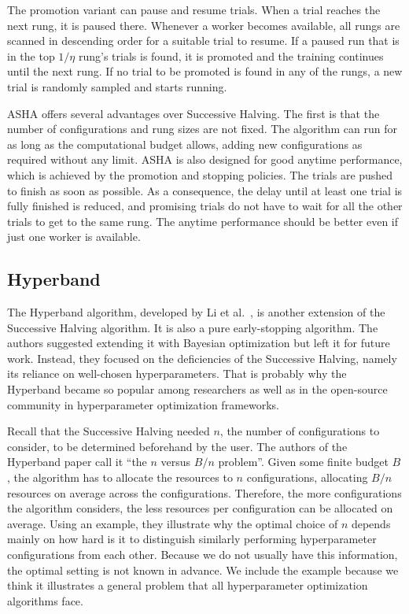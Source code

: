  The promotion variant can pause and resume trials. When a trial reaches the next rung, it is paused there. Whenever a worker becomes available, all rungs are scanned in descending order for a suitable trial to resume. If a paused run that is in the top $1/\eta$ rung's trials is found, it is promoted and the training continues until the next rung. If no trial to be promoted is found in any of the rungs, a new trial is randomly sampled and starts running.

 ASHA offers several advantages over Successive Halving. The first is that the number of configurations and rung sizes are not fixed. The algorithm can run for as long as the computational budget allows, adding new configurations as required without any limit. ASHA is also designed for good anytime performance, which is achieved by the promotion and stopping policies. The trials are pushed to finish as soon as possible. As a consequence, the delay until at least one trial is fully finished is reduced, and promising trials do not have to wait for all the other trials to get to the same rung. The anytime performance should be better even if just one worker is available.


\subsection{Hyperband}
The Hyperband algorithm, developed by Li et al.~\cite{li2018hyperband}, is another extension of the Successive Halving algorithm. It is also a pure early-stopping algorithm. The authors suggested extending it with Bayesian optimization but left it for future work. Instead, they focused on the deficiencies of the Successive Halving, namely its reliance on well-chosen hyperparameters. That is probably why the Hyperband became so popular among researchers as well as in the open-source community in hyperparameter optimization frameworks.

Recall that the Successive Halving needed $n$, the number of configurations to consider, to be determined beforehand by the user. The authors of the Hyperband paper call it ``the $n$ versus $B/n$ problem''. Given some finite budget $B$, the algorithm has to allocate the resources to $n$ configurations, allocating $B/n$ resources on average across the configurations. Therefore, the more configurations the algorithm considers, the less resources per configuration can be allocated on average. Using an example, they illustrate why the optimal choice of $n$ depends mainly on how hard is it to distinguish similarly performing hyperparameter configurations from each other. Because we do not usually have this information, the optimal setting is not known in advance. We include the example because we think it illustrates a general problem that all hyperparameter optimization algorithms face.

